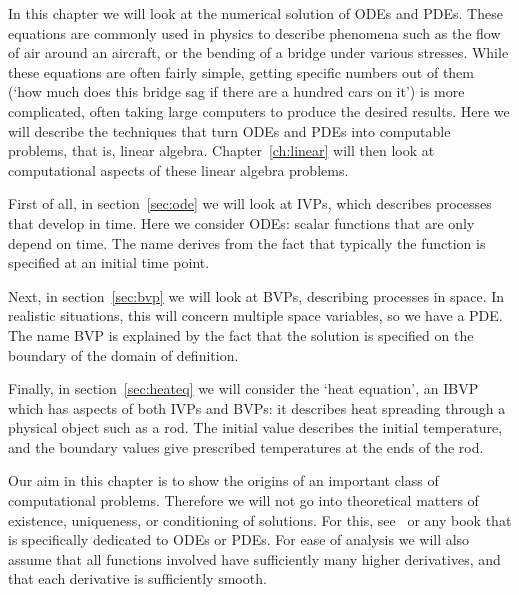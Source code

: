 
In this chapter we will look at the numerical solution of 
\acfp{ODE} and \acfp{PDE}.
These equations
are commonly used in physics to describe phenomena such as the
flow of air around an aircraft, or the bending of a bridge under
various stresses. While these equations are often fairly simple,
getting specific numbers out of them (`how much does this bridge sag
if there are a hundred cars on it') is more complicated, often taking large
computers to produce the desired results. Here we will describe the
techniques that turn \acp{ODE} and \acp{PDE} into computable problems,
that is, linear algebra. Chapter~\ref{ch:linear} will then look
at computational aspects of these linear algebra problems.

First of all, in section~\ref{sec:ode}
we will look at \acfp{IVP}, which describes processes
that develop in time. Here we consider \acp{ODE}: scalar functions that
are only depend on time. The name derives from the fact that typically
the function is specified at an initial time point.

Next, in section~\ref{sec:bvp}
we will look at \acp{BVP}, describing processes in space. In
realistic situations, this will concern multiple space variables, so
we have a \ac{PDE}.
The name \ac{BVP} is explained by the fact that the solution is
specified on the boundary of the domain of definition.

Finally, in section~\ref{sec:heateq}
we will consider the `heat equation', an \acf{IBVP}
which has
aspects of both \acp{IVP} and \acp{BVP}: it describes heat spreading through a
physical object such as a rod. The initial value describes the initial
temperature, and the boundary values give prescribed temperatures at
the ends of the rod.

Our aim in this chapter is to show the origins of an important class
of computational problems. Therefore we will not go into theoretical
matters of existence, uniqueness, or conditioning of solutions. For
this, see~\cite{Heath:scicomp} or any book that is specifically
dedicated to \acp{ODE} or \acp{PDE}.
For ease of analysis we will also assume that all functions involved
have sufficiently many higher derivatives, and that each derivative is
sufficiently smooth.

